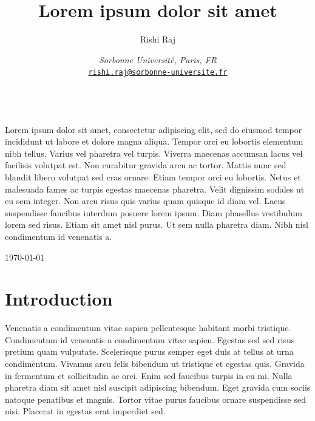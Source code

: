 \documentclass[10pt, a4paper]{article}
\title{Lorem ipsum dolor sit amet}
\author{Rishi Raj}
\date{
    \noindent\textit{Sorbonne Université, Paris, FR}\\[0.2cm]
    \href{mailto:rishiraj.1012exp@gmail.com}{\texttt{rishi.raj@sorbonne-universite.fr}}
}
\numberwithin{equation}{section}
\renewenvironment{abstract}
 {\par\noindent\textbf{\abstractname}\ \ignorespaces\\[1ex]}
 {\par\medskip}
\begin{document}
\thispagestyle{empty}
\maketitle

\begin{abstract}
  Lorem ipsum dolor sit amet, consectetur adipiscing elit, sed do eiusmod tempor incididunt ut labore et dolore magna aliqua. Tempor orci eu lobortis elementum nibh tellus. Varius vel pharetra vel turpis. Viverra maecenas accumsan lacus vel facilisis volutpat est. Non curabitur gravida arcu ac tortor. Mattis nunc sed blandit libero volutpat sed cras ornare. Etiam tempor orci eu lobortis. Netus et malesuada fames ac turpis egestas maecenas pharetra. Velit dignissim sodales ut eu sem integer. Non arcu risus quis varius quam quisque id diam vel. Lacus suspendisse faucibus interdum posuere lorem ipsum. Diam phasellus vestibulum lorem sed risus. Etiam sit amet nisl purus. Ut sem nulla pharetra diam. Nibh nisl condimentum id venenatis a.
\end{abstract}

\vfill

\noindent\today

\newpage

\tableofcontents

\setlength{\parindent}{1ex}
\setlength{\parskip}{2ex}
\raggedright

\section{Introduction}

Venenatis a condimentum vitae sapien pellentesque habitant morbi tristique. Condimentum id venenatis a condimentum vitae sapien. Egestas sed sed risus pretium quam vulputate. Scelerisque purus semper eget duis at tellus at urna condimentum. Vivamus arcu felis bibendum ut tristique et egestas quis. Gravida in fermentum et sollicitudin ac orci. Enim sed faucibus turpis in eu mi. Nulla pharetra diam sit amet nisl suscipit adipiscing bibendum. Eget gravida cum sociis natoque penatibus et magnis. Tortor vitae purus faucibus ornare suspendisse sed nisi. Placerat in egestas erat imperdiet sed.
\end{document}
